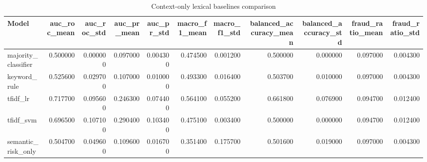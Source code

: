 \begin{table}[t]
\centering
\caption{Context-only lexical baselines comparison}
\label{tab:context_baselines}
\small
\begin{tabular}{lrrrrrrrrrr}
\toprule
Model & auc_roc_mean & auc_roc_std & auc_pr_mean & auc_pr_std & macro_f1_mean & macro_f1_std & balanced_accuracy_mean & balanced_accuracy_std & fraud_ratio_mean & fraud_ratio_std \\
\midrule
majority_classifier & 0.500000 & 0.000000 & 0.097000 & 0.004300 & 0.474500 & 0.001200 & 0.500000 & 0.000000 & 0.097000 & 0.004300 \\
keyword_rule & 0.525600 & 0.029700 & 0.107000 & 0.010000 & 0.493300 & 0.016400 & 0.503700 & 0.010000 & 0.097000 & 0.004300 \\
tfidf_lr & 0.717700 & 0.095600 & 0.246300 & 0.074400 & 0.564100 & 0.055200 & 0.661800 & 0.076900 & 0.094700 & 0.012400 \\
tfidf_svm & 0.696500 & 0.107100 & 0.290400 & 0.103400 & 0.475100 & 0.003400 & 0.500000 & 0.000000 & 0.094700 & 0.012400 \\
semantic_risk_only & 0.504700 & 0.049600 & 0.109600 & 0.016700 & 0.351400 & 0.175700 & 0.501600 & 0.019000 & 0.097000 & 0.004300 \\
\bottomrule
\end{tabular}
\end{table}
